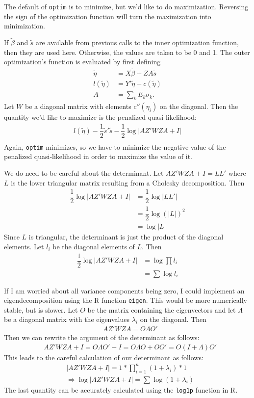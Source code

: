 \documentclass{article}
\begin{document}
The default of \texttt{optim} is to minimize, but we'd like to  do maximization. Reversing the sign of the optimization function will turn the maximization into minimization.

If $\tilde{\beta}$ and $\tilde{s}$ are available from previous calls to the inner optimization function, then they are used here. Otherwise, the values are taken to be 0 and 1. The outer optimization's function is evaluated by first defining
\begin{align}
\tilde{\eta} &= X \tilde{\beta} +ZA \tilde{s}\\
l(\tilde{\eta}) &= Y' \tilde{\eta} - c(\tilde{\eta})\\
A&= \sum_k E_k \sigma_k.
\end{align}
Let $W$ be a diagonal matrix with elements $c''(\eta_i)$ on the diagonal. Then the quantity we'd like to maximize is the penalized quasi-likelihood:
\begin{align}
 l(\tilde{\eta}) - \dfrac{1}{2} \tilde{s}' \tilde{s} - \dfrac{1}{2} \log  \left| AZ' W ZA +I  \right| \\
\end{align}
Again, \texttt{optim} minimizes, so we have to minimize the negative value of the penalized quasi-likelihood in order to maximize the value of it.

We do need to be careful about the determinant. Let $AZ' W ZA +I= LL'$ where $L$ is the lower triangular matrix resulting from a Cholesky decomposition. Then
\begin{align}
\dfrac{1}{2} \log | AZ' W ZA +I | &= \dfrac{1}{2} \log |LL'|\\
&=\dfrac{1}{2} \log (|L|)^2 \\
&= \log |L|
\end{align}
Since $L$ is triangular, the determinant is just the product of the diagonal elements. Let $l_i$ be the diagonal elements of $L$. Then
\begin{align}
\dfrac{1}{2} \log | AZ' W ZA +I | &= \log \prod l_i \\
&= \sum \log l_i
\end{align}

 If I am worried about all variance components being zero, I could implement an eigendecomposition using the R function \texttt{eigen}. This would be more numerically stable, but is slower. Let $O$ be the matrix containing the eigenvectors and let $\Lambda$ be a diagonal matrix with the eigenvalues $\lambda_i$ on the diagonal. Then
\begin{align}
 &AZ' W ZA = O \Lambda O' 
\end{align}
Then we can rewrite the argument of the determinant as follows:
\begin{align}
& AZ' W ZA +I  = O \Lambda O' + I = O \Lambda O + OO'=O (I+\Lambda) O' 
\end{align}
This leads to the careful calculation of our determinant as follows:
\begin{align}
&   \left| AZ' W ZA +I \right| = 1 *  \prod_{i=1}^n (1+\lambda_i) *1\\
&\Rightarrow \log   | AZ' W ZA +I | = \sum \log(1+\lambda_i) 
\end{align}
The last quantity can be accurately calculated using the \texttt{log1p} function in R.
\end{document}
